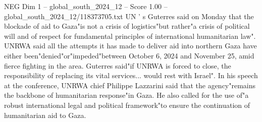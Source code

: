 \begin{textsample}{NEG Dim 1 – global\_south\_2024\_12 – Score 1.00 – global\_south\_2024\_12/118373705.txt}
UN ' s Guterres said on Monday that the blockade of aid to Gaza"is not a crisis of logistics"but rather"a crisis of political will and of respect for fundamental principles of international humanitarian law".
UNRWA said all the attempts it has made to deliver aid into northern Gaza have either been"denied"or"impeded"between October 6, 2024 and November 25, amid fierce fighting in the area.
Guterres said"if UNRWA is forced to close, the responsibility of replacing its vital services... would rest with Israel".
In his speech at the conference, UNRWA chief Philippe Lazzarini said that the agency"remains the backbone of humanitarian response"in Gaza.
He also called for the use of"a robust international legal and political framework"to ensure the continuation of humanitarian aid to Gaza.

\end{textsample}
